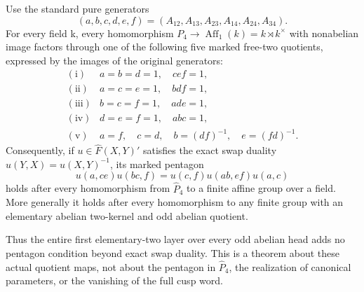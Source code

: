 Use the standard pure generators
\[
       (a,b,c,d,e,f)=(A_{12},A_{13},A_{23},A_{14},A_{24},A_{34}).
\tag{A.94.1}
\]
For every field k, every homomorphism
\(P_4\to\operatorname{Aff}_1(k)=k\rtimes k^\times\)
with nonabelian image factors through one of the following
five marked free-two quotients, expressed by the images of
the original generators:
\[
\begin{array}{c|l}
\mathrm{(i)}&a=b=d=1,\quad cef=1,\\
\mathrm{(ii)}&a=c=e=1,\quad bdf=1,\\
\mathrm{(iii)}&b=c=f=1,\quad ade=1,\\
\mathrm{(iv)}&d=e=f=1,\quad abc=1,\\
\mathrm{(v)}&a=f,\quad c=d,\quad b=(df)^{-1},\quad e=(fd)^{-1}.
\end{array}
\tag{A.94.2}
\]
Consequently, if \(u\in\widehat F(X,Y)'\) satisfies the
exact swap duality \(u(Y,X)=u(X,Y)^{-1}\), its marked pentagon
\[
       u(a,ce)u(bc,f)=u(c,f)u(ab,ef)u(a,c)
\tag{A.94.3}
\]
holds after every homomorphism from \(\widehat P_4\) to a
finite affine group over a field. More generally it holds after
every homomorphism to any finite group with an elementary
abelian two-kernel and odd abelian quotient.

Thus the entire first elementary-two layer over every odd
abelian head adds no pentagon condition beyond exact swap
duality. This is a theorem about these actual quotient maps,
not about the pentagon in \(\widehat P_4\), the realization
of canonical parameters, or the vanishing of the full cusp word.

